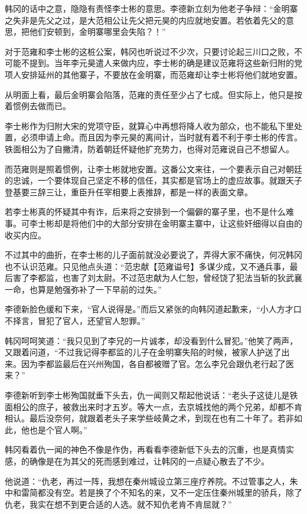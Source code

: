 韩冈的话中之意，隐隐有责怪李士彬的意思。李德新立刻为他老子争辩：“金明寨之失非是先父之过，是大范相公让先父把元昊的内应就地安置。若依着先父的意思，把他们安顿到，金明寨哪里会失陷？！”

对于范雍和李士彬的这桩公案，韩冈也听说过不少次，只要讨论起三川口之败，不可能不提到。当年李元昊遣人来做内应，李士彬的确是建议范雍将这些新归附的党项人安排延州的其他寨子，不要放在金明寨，而范雍却让李士彬将他们就地安置。

从明面上看，最后金明寨会陷落，范雍的责任至少占了七成。但实际上，他只是按着惯例去做而已。

李士彬作为归附大宋的党项守臣，就算心中再想将降人收为部众，也不能私下里处置，必须申请上命。而且因为李元昊的离间计，当时就有着不利于李士彬的传言。铁面相公为了自撇清，防着朝廷怀疑他扩充势力，也得对范雍说自己不想留人。

而范雍则是照着惯例，让李士彬就地安置。这番公文来往，一个要表示自己对朝廷的忠诚，一个要体现自己坚定不移的信任，其实都是官场上的虚应故事。就跟天子登基要三辞三让，重臣升任宰相要上表推辞，都是一样的表面文章。

若李士彬真的怀疑其中有诈，后来将之安排到一个偏僻的寨子里，也不是什么难事。可李士彬却是将他们中的大部分安排在金明寨主寨中，让这些奸细得以自由的收买内应。

不过其中的曲折，在李士彬的儿子面前就没必要说了，弄得大家不痛快，何况韩冈也不认识范雍。只见他点头道：“范忠献【范雍谥号】多谋少成，又不通兵事，最后害了李都监，也害了刘太尉。不过范忠献为人仁恕，曾经饶了犯法当斩的狄武襄一命，也算是勉强弥补了一下早前的过失。”

李德新脸色缓和下来，“官人说得是。”而后又紧张的向韩冈道起歉来，“小人方才口不择言，冒犯了官人，还望官人恕罪。”

韩冈呵呵笑道：“我只见到了李兄的一片诚孝，却没看到什么冒犯。”他笑了两声，又跟着问道，“不过我记得李都监的儿子在金明寨失陷的时候，被家人护送了出来。因为李都监最后在兴州殉国，各自都被赠了官。怎么李兄会跟仇老行起了医来？”

李德新听到李士彬殉国就垂下头去，仇一闻则又帮起他说话：“老头子这徒儿是铁面相公的庶子，被救出来时才五岁。等大一点，去京城找他的两个兄弟，却都不肯相认。最后没奈何，就跟着老头子来学些岐黄之术，到现在也有二十年了。若非如此，他也是个官人啊。”

韩冈看着仇一闻的神色不像是作伪，再看看李德新低下头去的沉重，也是真情实感，的确像是在为其父的死而感到难过，让韩冈的一点疑心散去了不少。

他说道：“仇老，再过一阵，我想在秦州城设立第三座疗养院。不过管事之人，朱中和雷简都没有空。若是换了个不知名的来，又不一定压住秦州城里的骄兵，除了仇老，我实在想不到更合适的人选。就不知仇老肯不肯屈就？”

